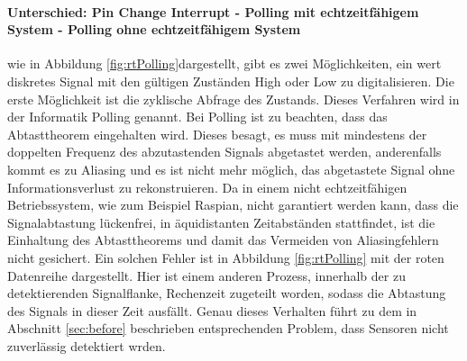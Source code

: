 \documentclass[a4paper, 11pt]{report}
\begin{document}
				\paragraph{Unterschied: Pin Change Interrupt - Polling mit echtzeitfähigem System - Polling ohne echtzeitfähigem System}
					wie in Abbildung \ref{fig:rtPolling}dargestellt, gibt es zwei Möglichkeiten, ein wert diskretes Signal mit den gültigen Zuständen High oder Low zu digitalisieren.
					Die erste Möglichkeit ist die zyklische Abfrage des Zustands. Dieses Verfahren wird in der Informatik Polling genannt.
					Bei Polling ist zu beachten, dass das Abtasttheorem eingehalten wird. 
					Dieses besagt, es muss mit mindestens der doppelten Frequenz des abzutastenden Signals abgetastet werden, 
					anderenfalls kommt es zu Aliasing und es ist nicht mehr möglich, das abgetastete Signal ohne Informationsverlust zu rekonstruieren.
					Da in einem nicht echtzeitfähigen Betriebssystem, wie zum Beispiel Raspian, nicht garantiert werden kann, 
					dass die Signalabtastung lückenfrei, in äquidistanten Zeitabständen stattfindet,
					ist die Einhaltung des Abtasttheorems und damit das Vermeiden von Aliasingfehlern nicht gesichert.
					Ein solchen Fehler ist in Abbildung \ref{fig:rtPolling} mit der roten Datenreihe dargestellt. Hier ist einem anderen Prozess, 
					innerhalb der zu detektierenden Signalflanke, Rechenzeit zugeteilt worden, sodass die Abtastung des Signals in dieser Zeit ausfällt.
					Genau dieses Verhalten führt zu dem in Abschnitt \ref{sec:before} beschrieben entsprechenden Problem, dass Sensoren nicht zuverlässig detektiert wrden.
\end{document}
